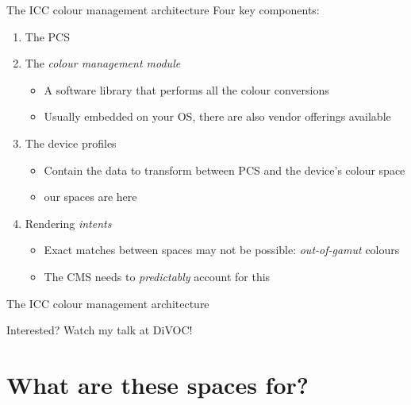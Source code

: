 \documentclass[aspectratio=169,handout]{fireshonks}
\begin{document}
\begin{frame}{The ICC colour management architecture}
    Four key components:
    \begin{enumerate}[<+(1)->]
        \item The PCS
        \item The \emph{colour management module}
              \begin{itemize}
                  \item A software library that performs all the colour conversions
                  \item Usually embedded on your OS, there are also vendor offerings available
              \end{itemize}
        \item The device profiles
              \begin{itemize}
                  \item Contain the data to transform between PCS and the device's colour space
                  \item {} our spaces are here
              \end{itemize}
        \item Rendering \emph{intents}
              \begin{itemize}
                  \item Exact matches between spaces may not be possible: \emph{out-of-gamut} colours
                  \item The CMS needs to \emph{predictably} account for this
              \end{itemize}
    \end{enumerate}
\end{frame}
\begin{frame}{The ICC colour management architecture}
    \begin{center}
        Interested? Watch my talk at DiVOC!

    \end{center}
\end{frame}
\section{What are these spaces for?}
\end{document}

